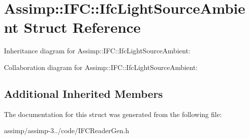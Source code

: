 \hypertarget{struct_assimp_1_1_i_f_c_1_1_ifc_light_source_ambient}{\section{Assimp\+:\+:I\+F\+C\+:\+:Ifc\+Light\+Source\+Ambient Struct Reference}
\label{struct_assimp_1_1_i_f_c_1_1_ifc_light_source_ambient}
}


Inheritance diagram for Assimp\+:\+:I\+F\+C\+:\+:Ifc\+Light\+Source\+Ambient\+:


Collaboration diagram for Assimp\+:\+:I\+F\+C\+:\+:Ifc\+Light\+Source\+Ambient\+:
\subsection*{Additional Inherited Members}


The documentation for this struct was generated from the following file\+:\begin{DoxyCompactItemize}
\item 
assimp/assimp-\/3../code/I\+F\+C\+Reader\+Gen.\+h\end{DoxyCompactItemize}
